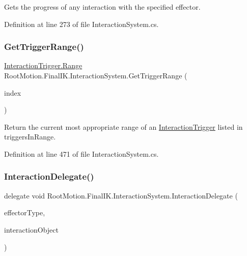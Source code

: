 Gets the progress of any interaction with the specified effector. 



Definition at line 273 of file Interaction\+System.\+cs.

\mbox{\label{class_root_motion_1_1_final_i_k_1_1_interaction_system_a33b3ea9f645971b42ea6bc87e97c1f8e}} 
\subsubsection{\texorpdfstring{Get\+Trigger\+Range()}{GetTriggerRange()}}
{\footnotesize\ttfamily \mbox{\hyperlink{class_root_motion_1_1_final_i_k_1_1_interaction_trigger_1_1_range}{Interaction\+Trigger.\+Range}} Root\+Motion.\+Final\+I\+K.\+Interaction\+System.\+Get\+Trigger\+Range (\begin{DoxyParamCaption}\item[{int}]{index }\end{DoxyParamCaption})}



Return the current most appropriate range of an \mbox{\hyperlink{class_root_motion_1_1_final_i_k_1_1_interaction_trigger}{Interaction\+Trigger}} listed in triggers\+In\+Range. 



Definition at line 471 of file Interaction\+System.\+cs.

\mbox{\label{class_root_motion_1_1_final_i_k_1_1_interaction_system_aa5a8c5136773b4244ab8f7ce707620b7}} 
\subsubsection{\texorpdfstring{Interaction\+Delegate()}{InteractionDelegate()}}
{\footnotesize\ttfamily delegate void Root\+Motion.\+Final\+I\+K.\+Interaction\+System.\+Interaction\+Delegate (\begin{DoxyParamCaption}\item[{\mbox{\hyperlink{namespace_root_motion_1_1_final_i_k_ae0dd2058c7667b6f132c11a6b860c14a}{Full\+Body\+Biped\+Effector}}}]{effector\+Type,  }\item[{\mbox{\hyperlink{class_root_motion_1_1_final_i_k_1_1_interaction_object}{Interaction\+Object}}}]{interaction\+Object }\end{DoxyParamCaption})}



